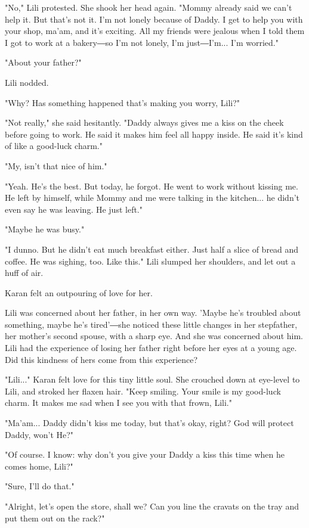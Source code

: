 "No," Lili protested. She shook her head again. "Mommy already said we
can't help it. But that's not it. I'm not lonely because of Daddy. I get
to help you with your shop, ma'am, and it's exciting. All my friends
were jealous when I told them I got to work at a bakery―so I'm not
lonely, I'm just―I'm... I'm worried."

"About your father?"

Lili nodded.

"Why? Has something happened that's making you worry, Lili?"

"Not really," she said hesitantly. "Daddy always gives me a kiss on the
cheek before going to work. He said it makes him feel all happy inside.
He said it's kind of like a good-luck charm."

"My, isn't that nice of him."

"Yeah. He's the best. But today, he forgot. He went to work without
kissing me. He left by himself, while Mommy and me were talking in the
kitchen... he didn't even say he was leaving. He just left."

"Maybe he was busy."

"I dunno. But he didn't eat much breakfast either. Just half a slice of
bread and coffee. He was sighing, too. Like this." Lili slumped her
shoulders, and let out a huff of air.

Karan felt an outpouring of love for her.

Lili was concerned about her father, in her own way. 'Maybe he's
troubled about something, maybe he's tired'―she noticed these little
changes in her stepfather, her mother's second spouse, with a sharp eye.
And she was concerned about him. Lili had the experience of losing her
father right before her eyes at a young age. Did this kindness of hers
come from this experience?

"Lili..." Karan felt love for this tiny little soul. She crouched down
at eye-level to Lili, and stroked her flaxen hair. "Keep smiling. Your
smile is my good-luck charm. It makes me sad when I see you with that
frown, Lili."

"Ma'am... Daddy didn't kiss me today, but that's okay, right? God will
protect Daddy, won't He?"

"Of course. I know: why don't you give your Daddy a kiss this time when
he comes home, Lili?"

"Sure, I'll do that."

"Alright, let's open the store, shall we? Can you line the cravats on
the tray and put them out on the rack?"

